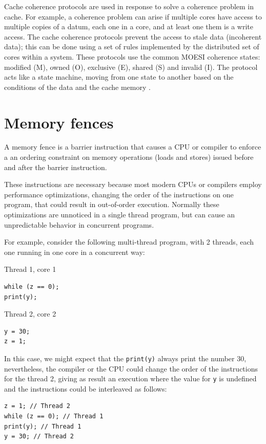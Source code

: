 \documentclass[openany, a4paper]{book}
\theoremstyle{break}
\theoremstyle{example}
\theoremstyle{note}
\theoremstyle{break}
\theoremstyle{exercise}
\begin{document}
\begin{enumerate}
Cache coherence protocols are used in response to solve a coherence problem
in cache. For example, a coherence problem can arise if multiple cores have
access to multiple copies of a datum, each one in a core, and at least one
them is a write access. The cache coherence protocols prevent the access to
stale data (incoherent data); this can be done using a set of rules
implemented by the distributed set of cores within a system. These
protocols use the common MOESI coherence states: modified (M), owned (O),
exclusive (E), shared (S) and invalid (I). The protocol acts like a state
machine, moving from one state to another based on the conditions of the
data and the cache memory \cite{DBLP_series_synthesis_2020Nagarajan}.
\end{enumerate}

\section{Memory fences}
\label{sec:org16a671a}

A memory fence is a barrier instruction that causes a CPU or compiler to
enforce a an ordering constraint on memory operations (loads and stores)
issued before and after the barrier instruction.

These instructions are necessary because most modern CPUs or compilers
employ performance optimizations, changing the order of the instructions on
one program, that could result in out-of-order execution. Normally these
optimizations are unnoticed in a single thread program, but can cause an
unpredictable behavior in concurrent programs.

For example, consider the following multi-thread program, with 2
threads, each one running in one core in a concurrent way:

Thread 1, core 1
\begin{verbatim}
while (z == 0);
print(y);
\end{verbatim}

Thread 2, core 2
\begin{verbatim}
y = 30;
z = 1;
\end{verbatim}

In this case, we might expect that the \texttt{print(y)} always print the number 30,
nevertheless, the compiler or the CPU could change the order of the
instructions for the thread 2, giving as result an execution where the value
for \texttt{y} is undefined and the instructions could be interleaved as follows:

\begin{verbatim}
z = 1; // Thread 2
while (z == 0); // Thread 1
print(y); // Thread 1
y = 30; // Thread 2
\end{verbatim}
\end{document}
